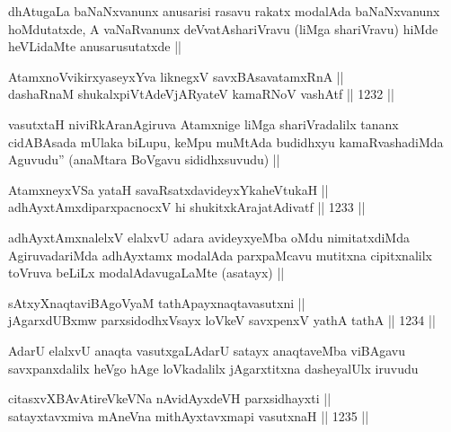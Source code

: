 \begin{artha}
dhAtugaLa baNaNxvanunx anusarisi rasavu rakatx modalAda baNaNxvanunx hoMdutatxde, A vaNaRvanunx deVvatAshariVravu (liMga shariVravu) hiMde heVLidaMte anusarusutatxde ||
\end{artha}


\begin{shl}
AtamxnoV\s vikirxyaseyxYva liknegxV savxBAsavatamxRnA ||  \\
dashaRnaM shukalxpiVtAdeVjARyateV kamaRNoV vashAtf ||  1232 ||  
\end{shl}

\begin{artha}
vasutxtaH niviRkAranAgiruva Atamxnige liMga shariVradalilx tananx cidABAsada mUlaka biLupu, keMpu muMtAda budidhxyu kamaRvashadiMda Aguvudu'' (anaMtara BoVgavu sididhxsuvudu) ||
\end{artha}


\begin{shl}
AtamxneyxVSa yataH savaRsatxdavideyxYkaheVtukaH || \\
adhAyxtAmxdiparxpacnocxV hi shukitxkArajatAdivatf ||  1233 ||  
\end{shl}

\begin{artha}
adhAyxtAmxnalelxV elalxvU adara avideyxyeMba oMdu nimitatxdiMda AgiruvadariMda adhAyxtamx modalAda parxpaMcavu mutitxna cipitxnalilx toVruva beLiLx modalAdavugaLaMte (asatayx) ||
\end{artha}


\begin{shl}
sAtxyXnaqtaviBAgoV\s yaM tathA\s payxnaqtavasutxni || \\
jAgarxdUBxmw parxsidodhxV\s sayx loVkeV savxpenxV yathA tathA ||  1234 ||  
\end{shl}

\begin{artha}
AdarU elalxvU anaqta vasutxgaLAdarU satayx anaqtaveMba viBAgavu savxpanxdalilx heVgo hAge loVkadalilx jAgarxtitxna dasheyalUlx iruvudu	 	
\end{artha}

\begin{shl}
citasxvXBAvAtireVkeVNa nAvidAyxdeVH parxsidhayxti || \\
satayxtavxmiva mAneVna mithAyxtavxmapi vasutxnaH ||  1235 ||  
\end{shl}
				
